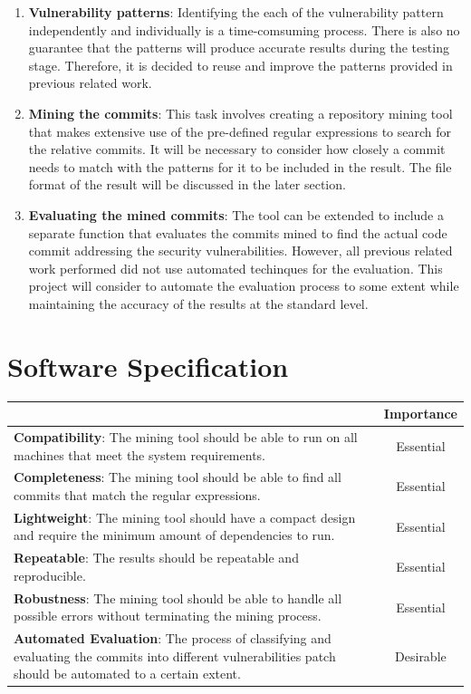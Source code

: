 \documentclass[12pt, a4paper]{report}
\begin{document}
{\begin{enumerate}
	\item \textbf{Vulnerability patterns}: Identifying the each of the vulnerability pattern
	independently and individually is a time-comsuming process. There is also no guarantee that the
	patterns will produce accurate results during the testing stage. Therefore, it is decided to reuse
	and improve the patterns provided in previous related work.
	\item \textbf{Mining the commits}: This task involves creating a repository mining tool that makes
	extensive use of the pre-defined regular expressions to search for the relative commits. It will
	be necessary to consider how closely a commit needs to match with the patterns for it to be
	included in the result. The file format of the result will be discussed in the later section.
	\item \textbf{Evaluating the mined commits}: The tool can be extended to include a separate
	function that evaluates the commits mined to find the actual code commit addressing the security
	vulnerabilities. However, all previous related work performed did not use automated techinques for
	the evaluation. This project will consider to automate the evaluation process to some extent while
	maintaining the accuracy of the results at the standard level.
\end{enumerate}

\section{Software Specification}
\begin{table}[H]
	\begin{center}
		\begin{tabular}{|p{9.5cm}|c|}
			\hline
			\rowcolor[HTML]{D8D8D8}
			\multicolumn{1}{|c|}{Criteria} & Importance \\ \hline
			\textbf{Compatibility}: The mining tool should be able to run on all machines that meet the
			system requirements. & Essential \\ \hline
			\textbf{Completeness}: The mining tool should be able to find all commits that match the
			regular expressions. & Essential \\ \hline
			\textbf{Lightweight}: The mining tool should have a compact design and require the minimum
			amount of dependencies to run. & Essential \\ \hline
			\textbf{Repeatable}: The results should be repeatable and reproducible. & Essential \\ \hline
			\textbf{Robustness}: The mining tool should be able to handle all possible errors without
			terminating the mining process. & Essential \\ \hline
			\textbf{Automated Evaluation}: The process of classifying and evaluating the commits into
			different vulnerabilities patch should be automated to a certain extent. & Desirable \\ \hline
			\end{tabular}
		 \label{table:criteria}
	\end{center}
\end{table}

}
\end{document}
